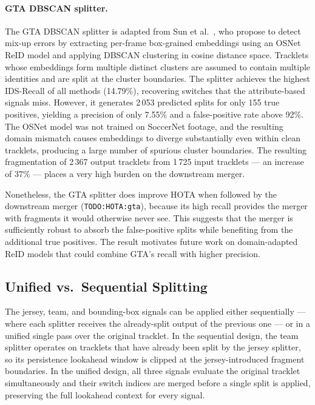 \paragraph{GTA DBSCAN splitter.}
The GTA DBSCAN splitter is adapted from Sun et al.~\cite{sun2024gta}, who
propose to detect mix-up errors by extracting per-frame box-grained embeddings
using an OSNet ReID model and applying DBSCAN clustering in cosine distance
space. Tracklets whose embeddings form multiple distinct clusters are assumed
to contain multiple identities and are split at the cluster boundaries. The
splitter achieves the highest IDS-Recall of all methods (14.79\%), recovering
switches that the attribute-based signals miss. However, it generates 2\,053
predicted splits for only 155 true positives, yielding a precision of only
7.55\% and a false-positive rate above 92\%. The OSNet model was not trained
on SoccerNet footage, and the resulting domain mismatch causes embeddings to
diverge substantially even within clean tracklets, producing a large number of
spurious cluster boundaries. The resulting fragmentation of 2\,367 output
tracklets from 1\,725 input tracklets — an increase of 37\% — places a very
high burden on the downstream merger.

Nonetheless, the GTA splitter does improve HOTA when followed by the downstream
merger (\texttt{TODO:HOTA:gta}), because its high recall provides the merger
with fragments it would otherwise never see. This suggests that the merger is
sufficiently robust to absorb the false-positive splits while benefiting from
the additional true positives. The result motivates future work on
domain-adapted ReID models that could combine GTA's recall with higher
precision.

\subsection{Unified vs.\ Sequential Splitting}\label{subsec:unified_vs_sequential}

The jersey, team, and bounding-box signals can be applied either sequentially
— where each splitter receives the already-split output of the previous one —
or in a unified single pass over the original tracklet. In the sequential
design, the team splitter operates on tracklets that have already been split
by the jersey splitter, so its persistence lookahead window is clipped at the
jersey-introduced fragment boundaries. In the unified design, all three
signals evaluate the original tracklet simultaneously and their switch indices
are merged before a single split is applied, preserving the full lookahead
context for every signal.

